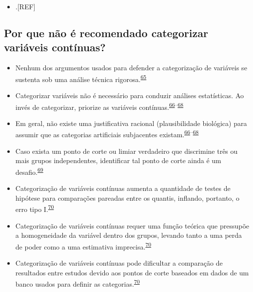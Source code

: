 \documentclass[
  a4paper,
]{book}
\providecommand{\tightlist}{%
  \setlength{\itemsep}{0pt}\setlength{\parskip}{0pt}}
\begin{document}
\begin{itemize}
\tightlist
\item
  .{[}REF{]}
\end{itemize}

\hypertarget{por-que-nuxe3o-uxe9-recomendado-categorizar-variuxe1veis-contuxednuas}{%
\subsection{Por que não é recomendado categorizar variáveis contínuas?}\label{por-que-nuxe3o-uxe9-recomendado-categorizar-variuxe1veis-contuxednuas}}

\begin{itemize}
\item
  Nenhum dos argumentos usados para defender a categorização de variáveis se sustenta sob uma análise técnica rigorosa.\textsuperscript{\protect\hyperlink{ref-MacCallum2002}{65}}
\item
  Categorizar variáveis não é necessário para conduzir análises estatísticas. Ao invés de categorizar, priorize as variáveis contínuas.\textsuperscript{\protect\hyperlink{ref-Altman2006}{66}--\protect\hyperlink{ref-Collins2016}{68}}
\item
  Em geral, não existe uma justificativa racional (plausibilidade biológica) para assumir que as categorias artificiais subjacentes existam.\textsuperscript{\protect\hyperlink{ref-Altman2006}{66}--\protect\hyperlink{ref-Collins2016}{68}}
\item
  Caso exista um ponto de corte ou limiar verdadeiro que discrimine três ou mais grupos independentes, identificar tal ponto de corte ainda é um desafio.\textsuperscript{\protect\hyperlink{ref-Prince2017}{69}}
\item
  Categorização de variáveis contínuas aumenta a quantidade de testes de hipótese para comparações pareadas entre os quantis, inflando, portanto, o erro tipo I.\textsuperscript{\protect\hyperlink{ref-Bennette2012}{70}}
\item
  Categorização de variáveis contínuas requer uma função teórica que pressupõe a homogeneidade da variável dentro dos grupos, levando tanto a uma perda de poder como a uma estimativa imprecisa.\textsuperscript{\protect\hyperlink{ref-Bennette2012}{70}}
\item
  Categorização de variáveis contínuas pode dificultar a comparação de resultados entre estudos devido aos pontos de corte baseados em dados de um banco usados para definir as categorias.\textsuperscript{\protect\hyperlink{ref-Bennette2012}{70}}
\end{itemize}
\end{document}

